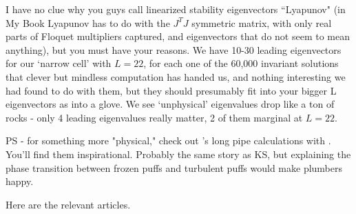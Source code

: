 I have no clue why you guys call linearized stability
eigenvectors ``Lyapunov" (in My Book Lyapunov has to do with
the $J^T J$ symmetric matrix, with only real parts of Floquet
multipliers captured, and eigenvectors that do not seem to
mean anything), but you must have your reasons. We have 10-30
leading eigenvectors for our `narrow cell' with $L=22$, for
each one of the 60,000 invariant solutions that clever but
mindless computation has handed us, and nothing interesting
we had found to do with them, but they should presumably fit
into your bigger L eigenvectors as into a glove. We see
`unphysical' eigenvalues drop like a ton of rocks - only 4
leading eigenvalues really matter, 2 of them marginal at
$L=22$.

PS - for something more "physical," check out
's long pipe calculations with
.
You'll find them inspirational. Probably the same story as KS, but explaining the
phase transition between frozen puffs and turbulent puffs would make plumbers happy.

 Here are the relevant articles.

